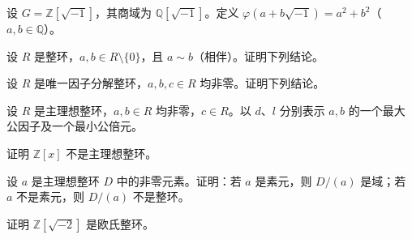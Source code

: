 \noindent\begin{minipage}{\textwidth}
设 $G=\mathbb{Z}[\sqrt{-1}]$，其商域为 $\mathbb{Q}[\sqrt{-1}]$。定义 $\varphi(a+b\sqrt{-1})=a^2+b^2$（$a,b\in\mathbb{Q}$）。
\end{minipage}\par\vfill
\newpage
\noindent\begin{minipage}{\textwidth}
设 $R$ 是整环，$a,b\in R\setminus\{0\}$，且 $a\sim b$（相伴）。证明下列结论。
\end{minipage}\par\vfill
\noindent\begin{minipage}{\textwidth}
设 $R$ 是唯一因子分解整环，$a,b,c\in R$ 均非零。证明下列结论。
\end{minipage}\par\vfill
\noindent\begin{minipage}{\textwidth}
设 $R$ 是主理想整环，$a,b\in R$ 均非零，$c\in R$。以 $d$、$l$ 分别表示 $a,b$ 的一个最大公因子及一个最小公倍元。
\end{minipage}\par\vfill
\newpage
\noindent\begin{minipage}{\textwidth}
证明 $\mathbb{Z}[x]$ 不是主理想整环。
\end{minipage}\par\vfill
\noindent\begin{minipage}{\textwidth}
设 $a$ 是主理想整环 $D$ 中的非零元素。证明：若 $a$ 是素元，则 $D/(a)$ 是域；若 $a$ 不是素元，则 $D/(a)$ 不是整环。
\end{minipage}\par\vfill
\noindent\begin{minipage}{\textwidth}
证明 $\mathbb{Z}[\sqrt{-2}]$ 是欧氏整环。
\end{minipage}\par\vfill
